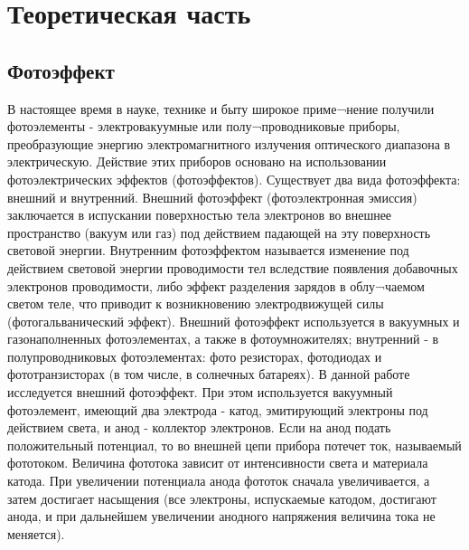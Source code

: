 



\def\labauthors{Сарафанов Ф.Г., Понур К.А., Сидоров Д.А.}
\def\labgroup{430}
\def\labnumber{1}
\def\labtheme{Исследование фотоэффекта и измерение постоянной Планка}
\renewcommand{\vec}{\mathbf}
\renewcommand{\Re}{\operatorname{Re}}
\renewcommand{\Im}{\operatorname{Im}}
\renewcommand{\phi}{\varphi}
\renewcommand{\hat}{\widehat}



\tableofcontents
\newpage

\section{Теоретическая часть}
\subsection*{Фотоэффект}
В настоящее время в науке, технике и быту широкое приме¬нение получили фотоэлементы - электровакуумные или полу¬проводниковые приборы, преобразующие энергию электромагнитного излучения оптического диапазона в электрическую. Действие этих приборов основано на использовании фотоэлектрических эффектов (фотоэффектов). 
Существует два вида фотоэффекта: внешний и внутренний. Внешний фотоэффект (фотоэлектронная эмиссия) заключается в испускании поверхностью тела электронов во внешнее пространство (вакуум или газ) под действием падающей на эту поверхность световой энергии. Внутренним фотоэффектом называется изменение под действием световой энергии проводимости тел вследствие появления добавочных электронов проводимости, либо эффект разделения зарядов в облу¬чаемом светом теле, что приводит к возникновению электродвижущей силы (фотогальванический эффект). Внешний фотоэффект используется в вакуумных и газонаполненных фотоэлементах, а также в фотоумножителях; внутренний - в полупроводниковых фотоэлементах: фото резисторах, фотодиодах и фототранзисторах (в том числе, в солнечных батареях).
В данной работе исследуется внешний фотоэффект. При этом используется вакуумный фотоэлемент, имеющий два электрода - катод, эмитирующий электроны под действием света, и анод - коллектор электронов. Если на анод подать положительный потенциал, то во внешней цепи прибора потечет ток, называемый фототоком. Величина фототока зависит от интенсивности света и материала катода. При увеличении потенциала анода фототок сначала увеличивается, а затем достигает насыщения (все электроны, испускаемые катодом, достигают анода, и при дальнейшем увеличении анодного напряжения величина тока не меняется).

